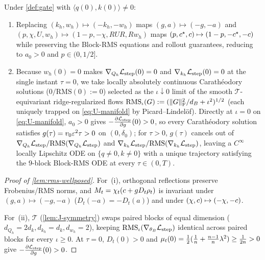 \begin{lemma}
\label{lem:rms-wellposed}
Under \cref{def:gate} with $\langle q(0), k(0)\rangle \ne 0$:
\begin{enumerate}[label=(\roman*),leftmargin=*,itemsep=1pt,topsep=2pt]
\item Replacing $(k_h, w_h) \mapsto (-k_h, -w_h)$ maps $(g, a) \mapsto (-g, -a)$ and $(p, \chi, U, w_h) \mapsto (1-p, -\chi, RUR, Rw_h)$ maps $(p, c^\star, c) \mapsto (1-p, -c^\star, -c)$ while preserving the Block-RMS equations and rollout guarantees, reducing to $a_0 > 0$ and $p \in (0, 1/2]$.
\item Because $w_h(0) = 0$ makes $\nabla_{Q_h}\mathcal L_{\mathrm{step}}(0) = 0$ and $\nabla_{k_h}\mathcal L_{\mathrm{step}}(0) = 0$ at the single instant $\tau = 0$, we take locally absolutely continuous Carath\'eodory solutions ($0/\mathrm{RMS}(0) := 0$) selected as the $\iota \downarrow 0$ limit of the smooth $\mathcal T$-equivariant ridge-regularized flows $\mathrm{RMS}_\iota(G) := (\|G\|_{\mathrm{F}}^2/d_B + \iota^2)^{1/2}$ (each uniquely trapped on \cref{eq:U-manifold} by Picard--Lindel\"of). Directly at $\iota = 0$ on \cref{eq:U-manifold}, $a_0 > 0$ gives $-\pd{\Lstep}{g}(0) > 0$, so every Carath\'eodory solution satisfies $g(\tau) = v_0\varepsilon^2\tau > 0$ on $(0, \delta_0)$; for $\tau > 0$, $g(\tau)$ cancels out of $\nabla_{Q_h}\mathcal L_{\mathrm{step}}/\mathrm{RMS}(\nabla_{Q_h}\mathcal L_{\mathrm{step}})$ and $\nabla_{k_h}\mathcal L_{\mathrm{step}}/\mathrm{RMS}(\nabla_{k_h}\mathcal L_{\mathrm{step}})$, leaving a $C^\infty$ locally Lipschitz ODE on $\{q \ne 0, k \ne 0\}$ with a unique trajectory satisfying the $9$-block Block-RMS ODE at every $\tau \in (0, T)$.
\end{enumerate}
\end{lemma}
\begin{proof}[Proof of \cref{lem:rms-wellposed}]
For~(i), orthogonal reflections preserve Frobenius/RMS norms, and $M_t = \chi_t(c + g D_t\rho_t)$ is invariant under $(g, a) \mapsto (-g, -a)$ ($D_t(-a) = -D_t(a)$) and under $(\chi, c) \mapsto (-\chi, -c)$.

For~(ii), $\mathcal T$ (\cref{lem:J-symmetry}) swaps paired blocks of equal dimension ($d_{Q_h} = 2d_k, d_{k_h} = d_k, d_{w_h} = 2$), keeping $\mathrm{RMS}_\iota(\nabla_{\theta_B}\mathcal L_{\mathrm{step}})$ identical across paired blocks for every $\iota \ge 0$. At $\tau = 0$, $D_t(0) > 0$ and $\mu_t(0) = \frac{1}{2}(\frac{1}{n} + \frac{n-1}{n}\lambda^2) \ge \frac{1}{2n} > 0$ give $-\pd{\Lstep}{g}(0) > 0$.
\end{proof}

